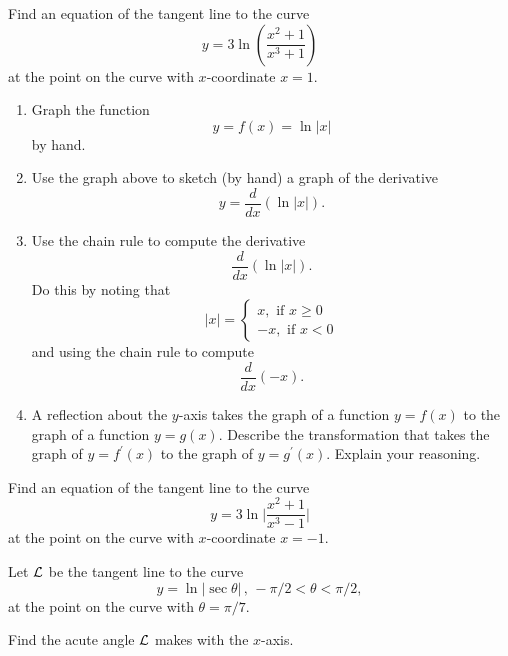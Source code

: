\documentclass{ximera}
\begin{document}
\begin{question} \label{Q89fghvbnm}
Find an equation of the tangent line to the curve
\[
    y = 3\ln \left( \frac{x^2+1}{x^3+1} \right)
\]
at the point on the curve with $x$-coordinate $x=1$.
\end{question}


\begin{question}  \label{Qggfdghbfrgbhrdtgr}
\begin{enumerate}
\item Graph the function 
\[
    y = f(x) = \ln |x|
\]
by hand.

\item Use the graph above to sketch (by hand) a graph of the derivative
\[
  y = \frac{d}{dx} \left( \ln |x|  \right) .
\]

\item Use the chain rule to compute the derivative
\[
   \frac{d}{dx} \left( \ln |x| \right) .
\]
Do this by noting that
\[
|x| = 
\begin{cases}
    x , \text{ if } x\geq 0 \\
   -x ,  \text{ if } x<0
\end{cases}
\]
and using the chain rule to compute 
\[
  \frac{d}{dx}  \left(  -x \right).
\]

\item A reflection about the $y$-axis takes the graph of a function $y=f(x)$ to the graph of a function $y=g(x)$. Describe the transformation that takes the graph of $y=f^\prime(x)$ to the graph of $y=g^\prime(x)$. Explain your reasoning.

\end{enumerate}

\end{question}

\begin{question} \label{Qhjklghvbnm}
Find an equation of the tangent line to the curve
\[
    y = 3\ln \Big| \frac{x^2+1}{x^3-1} \Big|
\]
at the point on the curve with $x$-coordinate $x=-1$.
\end{question}

\begin{question}  \label{Q435rtrtgfgfg}
Let ${\cal L}$ be the tangent line to the curve
\[
    y = \ln \left| \sec \theta  \right| \, , \, -\pi/2 < \theta < \pi/2 ,
\]
at the point on the curve with $\theta=\pi/7$.

Find the acute angle ${\cal L}$ makes with the $x$-axis.
\end{question}
\end{document}
